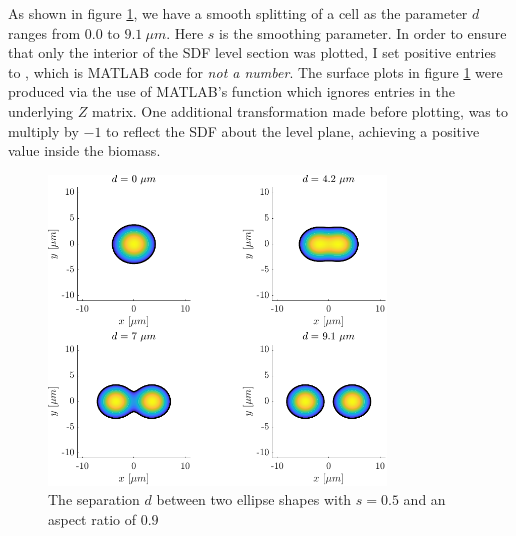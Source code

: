 As shown in figure \ref{fig:mitosisplot}, we have a smooth splitting of a 
cell as the parameter $d$ ranges from $0.0$ to $9.1 \ \mu m$. Here $s$ is the 
smoothing parameter. In order to ensure that only the interior
of the SDF level section was plotted, I set positive entries to ,
which is MATLAB code for \textit{not a number}. The surface plots in figure \ref{fig:mitosisplot}
were produced via the use of MATLAB's  function which ignores  entries
in the underlying $Z$ matrix. One additional transformation made before plotting, was to multiply by 
$-1$ to reflect the SDF about the level plane, achieving a positive value inside the biomass.
\begin{figure}[!htb]
    \centering
    \includegraphics[width=0.8\textwidth]{chapter2/figures/mitosisPlot.pdf}
    \caption{The separation $d$ between two ellipse shapes with $s = 0.5$ and 
    an aspect ratio of $0.9$}
    \label{fig:mitosisplot}
\end{figure}
\\

